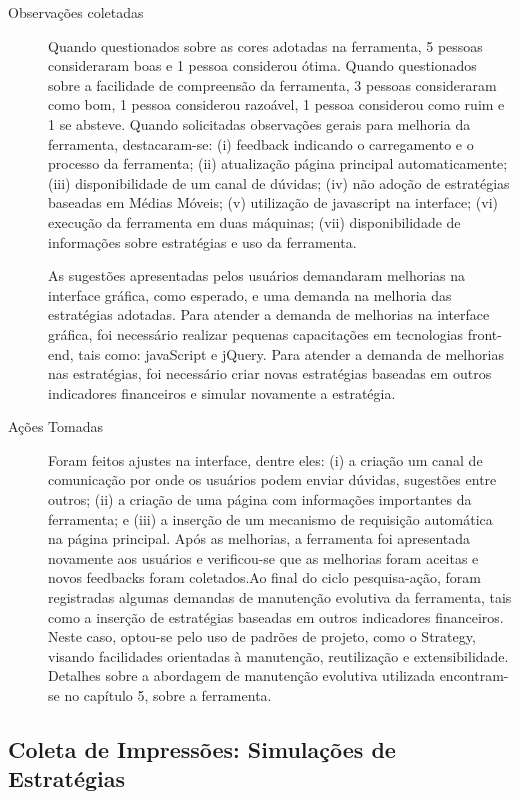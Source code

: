\begin{description}
\item[Observações coletadas]
Quando questionados sobre as cores adotadas na ferramenta, 5 pessoas consideraram boas e 1 pessoa considerou ótima. Quando questionados sobre a facilidade de compreensão da ferramenta, 3 pessoas consideraram como bom, 1 pessoa considerou razoável, 1 pessoa considerou como ruim e 1 se absteve. Quando solicitadas observações gerais para melhoria da ferramenta, destacaram-se: (i) feedback indicando o carregamento e o processo da ferramenta; (ii) atualização página principal automaticamente; (iii) disponibilidade de um canal de dúvidas; (iv) não adoção de estratégias baseadas em Médias Móveis; (v) utilização de javascript na interface; (vi) execução da ferramenta em duas máquinas; (vii) disponibilidade de informações sobre estratégias e uso da ferramenta.

As sugestões apresentadas pelos usuários demandaram melhorias na interface gráfica, como esperado, e uma demanda na melhoria das estratégias adotadas. Para atender a demanda de melhorias na interface gráfica, foi necessário realizar pequenas capacitações em tecnologias front-end, tais como: javaScript e jQuery. Para atender a demanda de melhorias nas estratégias, foi necessário criar novas estratégias baseadas em outros indicadores financeiros e simular novamente a estratégia.

\item[Ações Tomadas]

Foram feitos ajustes na interface, dentre eles: (i) a criação um canal de comunicação por onde os usuários podem enviar dúvidas, sugestões entre outros; (ii) a criação de uma página com informações importantes da ferramenta; e (iii) a inserção de um mecanismo de requisição automática na página principal. Após as melhorias, a ferramenta foi apresentada novamente aos usuários e verificou-se que as melhorias foram aceitas e novos feedbacks foram coletados.Ao final do ciclo pesquisa-ação, foram registradas algumas demandas de manutenção evolutiva da ferramenta, tais como a inserção de estratégias baseadas em outros indicadores financeiros. Neste caso, optou-se pelo uso de padrões de projeto, como o Strategy, visando facilidades orientadas à manutenção, reutilização e extensibilidade. Detalhes sobre a abordagem de manutenção evolutiva utilizada encontram-se no capítulo 5, sobre a ferramenta. 

\end{description}

\subsection{Coleta de Impressões: Simulações de Estratégias}

